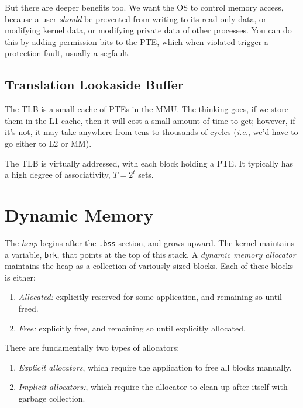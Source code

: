 \documentclass[fleqn]{article}
\begin{document}
But there are deeper benefits too. We want the OS to control memory access, because a user \textit{should} be prevented from writing to its read-only data, or modifying kernel data, or modifying private data of other processes. You can do this by adding permission bits to the PTE, which when violated trigger a protection fault, usually a segfault.

\subsection{Translation Lookaside Buffer}

The TLB is a small cache of PTEs in the MMU. The thinking goes, if we store them in the L1 cache, then it will cost a small amount of time to get; however, if it's not, it may take anywhere from tens to thousands of cycles (\textit{i.e.}, we'd have to go either to L2 or MM).

The TLB is virtually addressed, with each block holding a PTE. It typically has a high degree of associativity, $T = 2^t$ sets.


\section{Dynamic Memory}

The \textit{heap} begins after the \texttt{.bss} section, and grows upward. The kernel maintains a variable, \texttt{brk}, that points at the top of this stack. A \textit{dynamic memory allocator} maintains the heap as a collection of variously-sized blocks. Each of these blocks is either:

\begin{enumerate}
\item \textit{Allocated:} explicitly reserved for some application, and remaining so until freed.

\item \textit{Free:} explicitly free, and remaining so until explicitly allocated.
\end{enumerate}

There are fundamentally two types of allocators:

\begin{enumerate}
\item \textit{Explicit allocators}, which require the application to free all blocks manually.

\item \textit{Implicit allocators:}, which require the allocator to clean up after itself with garbage collection.
\end{enumerate}
\end{document}
